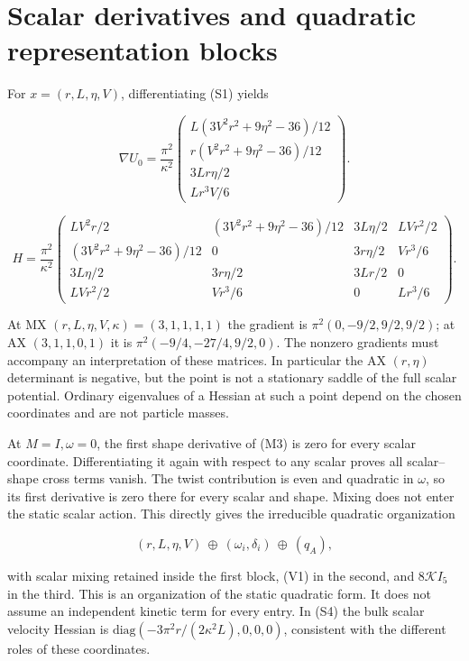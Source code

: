 \section{Scalar derivatives and quadratic representation blocks}

\label{app:F}

For $x=(r,L,\eta,V)$, differentiating (S1) yields

\begin{equation}\tag{F1}\label{eq:F1}
\nabla U_0=\frac{\pi^2}{\kappa^2}
\begin{pmatrix}
L(3V^2r^2+9\eta^2-36)/12\\
r(V^2r^2+9\eta^2-36)/12\\
3Lr\eta/2\\ Lr^3V/6
\end{pmatrix}.
\end{equation}

\begin{equation}\tag{F2}\label{eq:F2}
H=\frac{\pi^2}{\kappa^2}
\begin{pmatrix}
LV^2r/2 &(3V^2r^2+9\eta^2-36)/12&3L\eta/2&LVr^2/2\\
(3V^2r^2+9\eta^2-36)/12&0&3r\eta/2&Vr^3/6\\
3L\eta/2&3r\eta/2&3Lr/2&0\\
LVr^2/2&Vr^3/6&0&Lr^3/6
\end{pmatrix}.
\end{equation}

At MX $(r,L,\eta,V,\kappa)=(3,1,1,1,1)$ the gradient is $\pi^2(0,-9/2,9/2,9/2)$; at AX $(3,1,1,0,1)$ it is $\pi^2(-9/4,-27/4,9/2,0)$. The nonzero gradients must accompany an interpretation of these matrices. In particular the AX $(r,\eta)$ determinant is negative, but the point is not a stationary saddle of the full scalar potential. Ordinary eigenvalues of a Hessian at such a point depend on the chosen coordinates and are not particle masses.

At $M=I,\omega=0$, the first shape derivative of (M3) is zero for every scalar coordinate. Differentiating it again with respect to any scalar proves all scalar--shape cross terms vanish. The twist contribution is even and quadratic in $\omega$, so its first derivative is zero there for every scalar and shape. Mixing does not enter the static scalar action. This directly gives the irreducible quadratic organization

\begin{equation}\tag{F3}\label{eq:F3}
(r,L,\eta,V)\ \oplus\ (\omega_i,\delta_i)\ \oplus\ (q_A),
\end{equation}

with scalar mixing retained inside the first block, (V1) in the second, and $8\mathcal K I_5$ in the third. This is an organization of the static quadratic form. It does not assume an independent kinetic term for every entry. In (S4) the bulk scalar velocity Hessian is $\mathrm{diag}(-3\pi^2r/(2\kappa^2L),0,0,0)$, consistent with the different roles of these coordinates.
